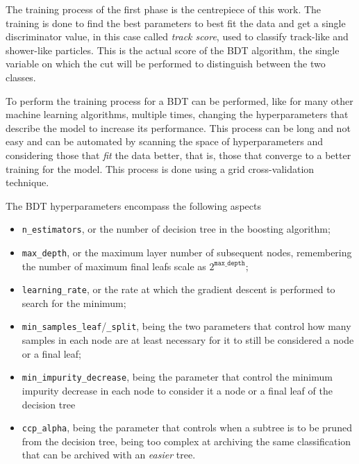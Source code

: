 The training process of the first phase is the centrepiece of this work. The training is done to find the best parameters to best fit the data and get a single discriminator value, in this case called \emph{track score}, used to classify track-like and shower-like particles. This is the actual score of the BDT algorithm, the single variable on which the cut will be performed to distinguish between the two classes. 

To perform the training process for a BDT can be performed, like for many other machine learning algorithms, multiple times, changing the hyperparameters that describe the model to increase its performance. This process can be long and not easy and can be automated by scanning the space of hyperparameters and considering those that \emph{fit} the data better, that is, those that converge to a better training for the model. This process is done using a grid cross-validation technique. 

The BDT hyperparameters encompass the following aspects\begin{itemize}
    \item \verb=n_estimators=, or the number of decision tree in the boosting algorithm;
    \item \verb=max_depth=, or the maximum layer number of subsequent nodes, remembering the number of maximum final leafs scale as $2^\texttt{max\_depth}$;
    \item \verb=learning_rate=, or the rate at which the gradient descent is performed to search for the minimum;
    \item \verb=min_samples_leaf=/\verb=_split=, being the two parameters that control how many samples in each node are at least necessary for it to still be considered a node or a final leaf;
    \item \verb=min_impurity_decrease=, being the parameter that control the minimum impurity decrease in each node to consider it a node or a final leaf of the decision tree
    \item \verb=ccp_alpha=, being the parameter that controls when a subtree is to be pruned from the decision tree, being too complex at archiving the same classification that can be archived with an \emph{easier} tree.
\end{itemize}

